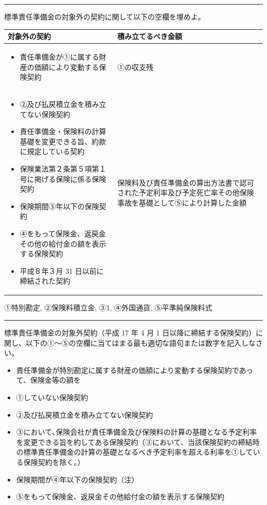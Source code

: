 \documentclass[report,gutter=10mm,fore-edge=10mm,uplatex,dvipdfmx]{jlreq}
\begin{document}
\begin{center}\rule{0.5\linewidth}{0.5pt}\end{center}


標準責任準備金の対象外の契約に関して以下の空欄を埋めよ。

\begin{tabularx}{\linewidth}{|X|X|}
 \hline
対象外の契約 & 積み立てるべき金額 \\ \hline
\begin{itemize}
 \item 責任準備金が①に属する財産の価額により変動する保険契約 
\end{itemize}
&   ①の収支残 \\ \hline
\begin{itemize}
 \item   ②及び払戻積立金を積み立てない保険契約
\item
  責任準備金・保険料の計算基礎を変更できる旨、約款に規定している契約
\item
  保険業法第２条第５項第１号に掲げる保険に係る保険契約
\item
  保険期間③年以下の保険契約
\item
  ④をもって保険金、返戻金その他の給付金の額を表示する保険契約
\item
  平成８年３月 31 日以前に締結された契約
\end{itemize} & 保険料及び責任準備金の算出方法書で認可された予定利率及び予定死亡率その他保険事故を基礎として⑤により計算した金額
\\ \hline
\end{tabularx}


①特別勘定, ②保険料積立金, ③1, ④外国通貨, ⑤平準純保険料式

\begin{center}\rule{0.5\linewidth}{0.5pt}\end{center}


標準責任準備金の対象外契約（平成 17 年 4 月 1
日以降に締結する保険契約）に関し、以下の①～⑤の空欄に当てはまる最も適切な語句または数字を記入しなさい。

\begin{itemize}
\tightlist
\item
  責任準備金が特別勘定に属する財産の価額により変動する保険契約であって、保険金等の額を
\item
  ①していない保険契約
\item
  ②及び払戻積立金を積み立てない保険契約
\item
  ③において､保険会社が責任準備金及び保険料の計算の基礎となる予定利率を変更できる旨を約してある保険契約（③において、当該保険契約の締結時の標準責任準備金の計算の基礎となるべき予定利率を超える利率を①している保険契約を除く。）
\item
  保険期間が④年以下の保険契約（注）
 \item ⑤をもって保険金、返戻金その他給付金の額を表示する保険契約
\end{itemize}
\end{document}
